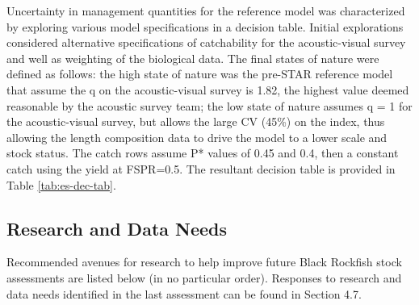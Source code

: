 \documentclass[11pt,
  letterpaper,
]{article}
\begin{document}


Uncertainty in management quantities for the reference model was characterized by exploring various model specifications in a decision table. Initial explorations considered alternative specifications of catchability for the acoustic-visual survey and well as weighting of the biological data. The final states of nature were defined as follows: the high state of nature was the pre-STAR reference model that assume the q on the acoustic-visual survey is 1.82, the highest value deemed reasonable by the acoustic survey team; the low state of nature assumes q = 1 for the acoustic-visual survey, but allows the large CV (45\%) on the index, thus allowing the length composition data to drive the model to a lower scale and stock status. The catch rows assume P* values of 0.45 and 0.4, then a constant catch using the yield at FSPR=0.5. The resultant decision table is provided in Table \ref{tab:es-dec-tab}.

\clearpage



\clearpage

\hypertarget{research-and-data-needs}{%
\subsection*{Research and Data Needs}\label{research-and-data-needs}}

Recommended avenues for research to help improve future Black Rockfish stock assessments are listed below (in no particular order). Responses to research and data needs identified in the last assessment can be found in Section 4.7.
\end{document}
